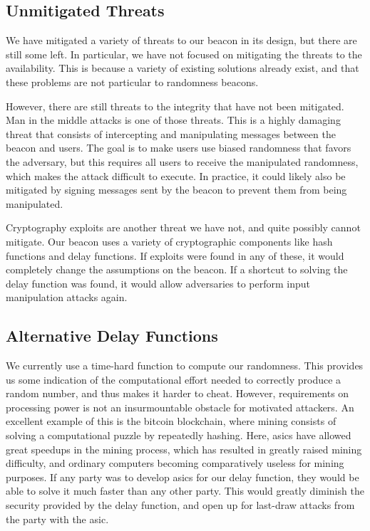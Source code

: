 \subsection{Unmitigated Threats}
We have mitigated a variety of threats to our beacon in its design, but there are still some left. In particular, we have not focused on mitigating the threats to the availability. This is because a variety of existing solutions already exist, and that these problems are not particular to randomness beacons.

However, there are still threats to the integrity that have not been mitigated. Man in the middle attacks is one of those threats. This is a highly damaging threat that consists of intercepting and manipulating messages between the beacon and users. The goal is to make users use biased randomness that favors the adversary, but this requires all users to receive the manipulated randomness, which makes the attack difficult to execute. In practice, it could likely also be mitigated by signing messages sent by the beacon to prevent them from being manipulated.

Cryptography exploits are another threat we have not, and quite possibly cannot mitigate. Our beacon uses a variety of cryptographic components like hash functions and delay functions. If exploits were found in any of these, it would completely change the assumptions on the beacon.
If a shortcut to solving the delay function was found, it would allow adversaries to perform input manipulation attacks again.

\subsection{Alternative Delay Functions}
We currently use a time-hard function to compute our randomness. This provides us some indication of the computational effort needed to correctly produce a random number, and thus makes it harder to cheat.
However, requirements on processing power is not an insurmountable obstacle for motivated attackers. An excellent example of this is the bitcoin blockchain, where mining consists of solving a computational puzzle by repeatedly hashing. Here, \glspl{asic} have allowed great speedups in the mining process, which has resulted in greatly raised mining difficulty, and ordinary computers becoming comparatively useless for mining purposes.
If any party was to develop \glspl{asic} for our delay function, they would be able to solve it much faster than any other party. This would greatly diminish the security provided by the delay function, and open up for last-draw attacks from the party with the \gls{asic}.


